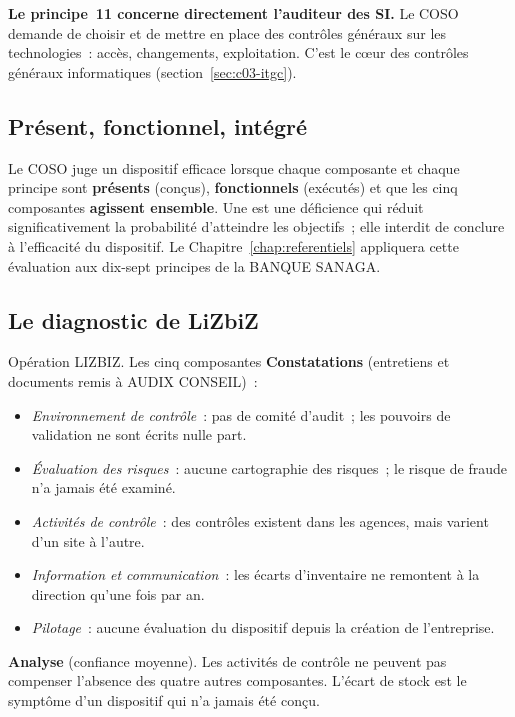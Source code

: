 \begin{boxinfo}
\textbf{Le principe~11 concerne directement l'auditeur des SI.} Le COSO
demande de choisir et de mettre en place des contrôles généraux sur les
technologies~: accès, changements, exploitation. C'est le cœur des
contrôles généraux informatiques (section~\ref{sec:c03-itgc}).
\end{boxinfo}

\subsection{Présent, fonctionnel, intégré}

Le COSO juge un dispositif efficace lorsque chaque composante et chaque
principe sont \textbf{présents} (conçus), \textbf{fonctionnels}
(exécutés) et que les cinq composantes \textbf{agissent ensemble}. Une
 est une déficience
qui réduit significativement la probabilité d'atteindre les objectifs~;
elle interdit de conclure à l'efficacité du dispositif. Le
Chapitre~\ref{chap:referentiels} appliquera cette évaluation aux dix-sept
principes de la BANQUE SANAGA.

\subsection{Le diagnostic de LiZbiZ}

\begin{boxscenario}{Opération LIZBIZ. Les cinq composantes}
\textbf{Constatations} (entretiens et documents remis à AUDIX CONSEIL)~:
\begin{itemize}
    \item \emph{Environnement de contrôle}~: pas de comité d'audit~; les
          pouvoirs de validation ne sont écrits nulle part.
    \item \emph{Évaluation des risques}~: aucune cartographie des risques~;
          le risque de fraude n'a jamais été examiné.
    \item \emph{Activités de contrôle}~: des contrôles existent dans les
          agences, mais varient d'un site à l'autre.
    \item \emph{Information et communication}~: les écarts d'inventaire ne
          remontent à la direction qu'une fois par an.
    \item \emph{Pilotage}~: aucune évaluation du dispositif depuis la
          création de l'entreprise.
\end{itemize}

\textbf{Analyse} (confiance moyenne). Les activités de contrôle ne peuvent
pas compenser l'absence des quatre autres composantes. L'écart de stock est
le symptôme d'un dispositif qui n'a jamais été conçu.
\end{boxscenario}

